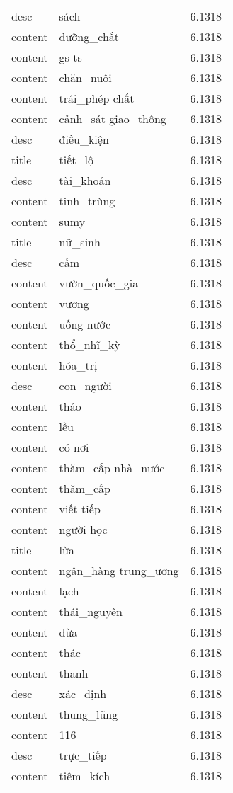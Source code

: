 \documentclass{article}
\begin{document}
\begin{tabular}{lll}
desc & sách & 6.1318\\
content & dưỡng\_chất & 6.1318\\
content & gs ts & 6.1318\\
content & chăn\_nuôi & 6.1318\\
content & trái\_phép chất & 6.1318\\
content & cảnh\_sát giao\_thông & 6.1318\\
desc & điều\_kiện & 6.1318\\
title & tiết\_lộ & 6.1318\\
desc & tài\_khoản & 6.1318\\
content & tinh\_trùng & 6.1318\\
content & sumy & 6.1318\\
title & nữ\_sinh & 6.1318\\
desc & cấm & 6.1318\\
content & vườn\_quốc\_gia & 6.1318\\
content & vương & 6.1318\\
content & uống nước & 6.1318\\
content & thổ\_nhĩ\_kỳ & 6.1318\\
content & hóa\_trị & 6.1318\\
desc & con\_người & 6.1318\\
content & thảo & 6.1318\\
content & lều & 6.1318\\
content & có nơi & 6.1318\\
content & thăm\_cấp nhà\_nước & 6.1318\\
content & thăm\_cấp & 6.1318\\
content & viết tiếp & 6.1318\\
content & người học & 6.1318\\
title & lừa & 6.1318\\
content & ngân\_hàng trung\_ương & 6.1318\\
content & lạch & 6.1318\\
content & thái\_nguyên & 6.1318\\
content & dừa & 6.1318\\
content & thác & 6.1318\\
content & thanh & 6.1318\\
desc & xác\_định & 6.1318\\
content & thung\_lũng & 6.1318\\
content & 116 & 6.1318\\
desc & trực\_tiếp & 6.1318\\
content & tiêm\_kích & 6.1318\\

\end{tabular}
\end{document}
